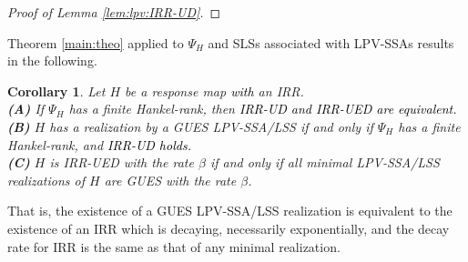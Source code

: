 \documentclass[journal,twoside,web]{ieeecolor}
\newtheorem{Corollary}[Theorem]{Corollary}
\begin{document}
\begin{proof}[Proof of Lemma \ref{lem:lpv:IRR-UD}]
  \end{proof}
  Theorem \ref{main:theo} applied to $\Psi_H$ and SLSs associated with LPV-SSAs results in the following.
      \begin{Corollary}%
        \label{cor:lpv}
        Let $H$ be a response map \textcolor{black}{with} an IRR. 
        \\
        \textbf{(A)}
         If $\Psi_H$ has a finite Hankel-rank, then
         \textcolor{black}{IRR-UD and IRR-UED are equivalent.}
         \\
        \textbf{(B)}
         $H$ has a realization by a GUES LPV-SSA/LSS if and only  if 
         $\Psi_H$ has a finite Hankel-rank, and 
         \textcolor{black}{IRR-UD holds.}
         \\
        \textbf{(C)}
         $H$ is IRR-UED with the rate $\beta$ if and only if all minimal 
         LPV-SSA/LSS realizations of $H$ are GUES with the rate $\beta$.
      \end{Corollary}
      That is, the existence of a GUES LPV-SSA/LSS realization is equivalent to the existence of an IRR which is decaying, necessarily exponentially, 
      and the decay rate for IRR is the same as that of any minimal realization.
\end{document}
